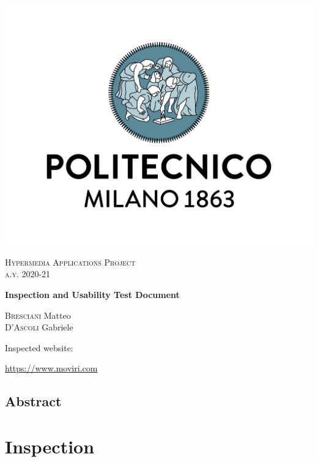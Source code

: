 \documentclass[fontsize=11pt,paper=a4,pagesize=auto]{report}
\begin{document}
\begin{titlepage}
	\centering
	\includegraphics[scale = 0.25]{images/polimi.jpg}\par
	
	{\scshape\Large
		Hypermedia Applications Project\\
		a.y. 2020-21\par}
			\vspace{0.5cm}
	{\huge\bfseries
		Inspection and Usability Test Document\\\par}

	\vspace{1cm}
	{\Large
		{\scshape Bresciani} Matteo\\
		{\scshape D'Ascoli}  Gabriele\par

		}
			\vspace{1cm}

		{\huge\Large
		Inspected website:}\\
					\vspace{0.5cm}

		\huge{\url{https://www.moviri.com}}
		
	
\end{titlepage}


\tableofcontents
\chapter{Abstract}


\part{Inspection}
\end{document}
